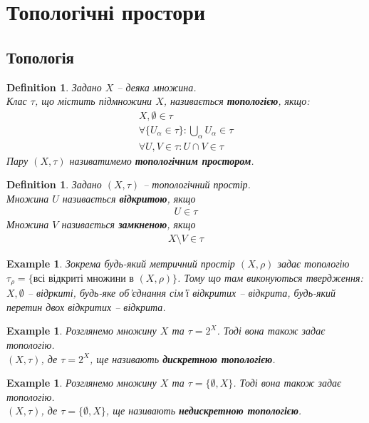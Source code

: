 \documentclass[a4paper, 10pt]{article}
\theoremstyle{theoremdd}
\newtheorem{definition}[theorem]{Definition}
\newtheorem{example}[theorem]{Example}
\begin{document}
\tableofcontents
\newpage

\section{Топологічні простори}
\subsection{Топологія}
\begin{definition}
Задано $X$ -- деяка множина.\\
Клас $\tau$, що містить підмножини $X$, називається \textbf{топологією}, якщо:
\begin{align*}
X, \emptyset \in \tau \\
\forall \{U_\alpha \in \tau\}: \bigcup_\alpha U_\alpha \in \tau \\
\forall U,V \in \tau: U \cap V \in \tau
\end{align*}
Пару $(X,\tau)$ називатимемо \textbf{топологічним простором}.
\end{definition}

\begin{definition}
Задано $(X,\tau)$ -- топологічний простір.\\
Множина $U$ називається \textbf{відкритою}, якщо
\begin{align*}
U \in \tau
\end{align*}
Множина $V$ називається \textbf{замкненою}, якщо
\begin{align*}
X \setminus V \in \tau
\end{align*}
\end{definition}

\begin{example}
Зокрема будь-який метричний простір $(X,\rho)$ задає топологію \\ $\tau_\rho = \{ \text{всі відкриті множини в } (X,\rho)\}$. Тому що там виконуються твердження: $X, \emptyset$ -- відркиті, будь-яке об'єднання сім'ї відкритих -- відкрита, будь-який перетин двох відкритих -- відкрита.
\end{example}

\begin{example}
Розглянемо множину $X$ та $\tau = 2^X$. Тоді вона також задає топологію.\\
$(X,\tau)$, де $\tau = 2^X$, ще називають \textbf{дискретною топологією}.
\end{example}

\begin{example}
Розглянемо множину $X$ та $\tau = \{\emptyset, X\}$. Тоді вона також задає топологію.\\
$(X,\tau)$, де $\tau = \{\emptyset, X\}$, ще називають \textbf{недискретною топологією}.
\end{example}
\end{document}
